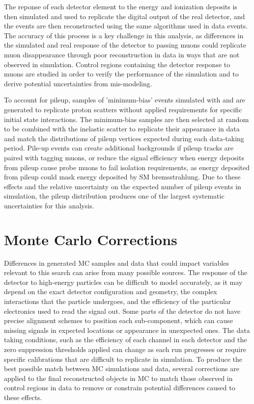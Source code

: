The reponse of each detector element to the energy and ionization deposits is then simulated and used to replicate the digital output of the real detector, and the events are then reconstructed using the same algorithms used in data events.
The accuracy of this process is a key challenge in this analysis, as differences in the simulated and real response of the detector to passing muons could replicate muon disappearance through poor reconstruction in data in ways that are not observed in simulation. 
Control regions containing the detector response to muons are studied in order to verify the performance of the simulation and to derive potential uncertainties from mis-modeling.

To account for pileup, samples of 'minimum-bias' events simulated with \pythia and \geant are generated to replicate proton scatters without applied requirements for specific initial state interactions.
The minimum-bias samples are then selected at random to be combined with the inelastic scatter to replicate their appearance in data and match the distributions of pileup vertices expected during each data-taking period.
Pile-up events can create additional backgrounds if pileup tracks are paired with tagging muons, or reduce the signal efficiency when energy deposits from pileup cause probe muons to fail isolation requirements, as energy deposited from pileup could mask energy deposited by SM bremsstrahlung.
Due to these effects and the relative uncertainty on the expected number of pileup events in simulation, the pileup distribution produces one of the largest systematic uncertainties for this analysis.

\section{Monte Carlo Corrections}
Differences in generated MC samples and data that could impact variables relevant to this search can arise from many possible sources.
The response of the detector to high-energy particles can be difficult to model accurately, as it may depend on the exact detector configuration and geometry, the complex interactions that the particle undergoes, and the efficiency of the particular electronics used to read the signal out.
Some parts of the detector do not have precise alignment schemes to position each sub-component, which can cause missing signals in expected locations or appearance in unexpected ones. 
The data taking conditions, such as the efficiency of each channel in each detector and the zero suppression thresholds applied can change as each run progresses or require specific calibrations that are difficult to replicate in simulation.
To produce the best possible match between MC simulations and data, several corrections are applied to the final reconstructed objects in MC to match those observed in control regions in data to remove or constrain potential differences caused to these effects.

